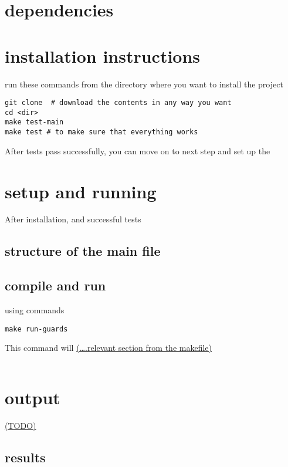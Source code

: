 \documentclass{elteikthesis}[2018/06/06]
\begin{document}
\section{dependencies}
\label{sec-2-2}
\section{installation instructions}
\label{sec-2-3}
run these commands from the directory where you want to install the project \\
\begin{verbatim}
git clone  # download the contents in any way you want
cd <dir>
make test-main
make test # to make sure that everything works
\end{verbatim}
After tests pass successfully, you can move on to next step and set up the \\
\section{setup and running}
\label{sec-2-4}
After installation, and successful tests \\
\subsection{structure of the main file}
\label{sec-2-4-1}

\subsection{compile and run}
\label{sec-2-4-2}
using commands \\
\begin{verbatim}
make run-guards
\end{verbatim}
This command will \uline{(\ldots{}.relevant section from the makefile)} \\
\begin{center}
\begin{tabular}{}
\\
\\
\end{tabular}
\end{center}
\section{output}
\label{sec-2-5}
\uline{(TODO)} \\
\subsection{results}
\label{sec-2-5-1}
\begin{center}
\begin{tabular}{}
\\
\\
\\
\end{tabular}
\end{center}
\end{document}
